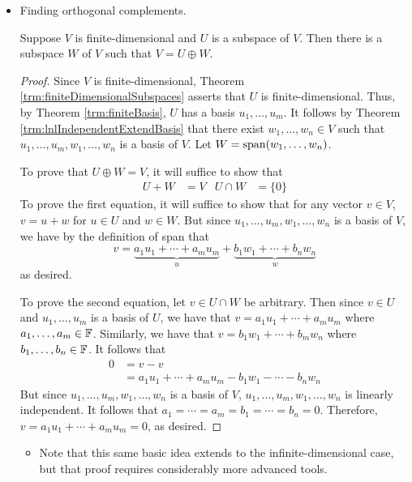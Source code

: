 \documentclass[../main.tex]{subfiles}
\begin{document}
\begin{itemize}
\begin{theorem}
\begin{proof}
        \end{proof}
    \end{theorem}
    \item Finding orthogonal complements.
    \begin{theorem}\label{trm:orthogonalComplement}
        Suppose $V$ is finite-dimensional and $U$ is a subspace of $V$. Then there is a subspace $W$ of $V$ such that $V=U\oplus W$.
        \begin{proof}
            Since $V$ is finite-dimensional, Theorem \ref{trm:finiteDimensionalSubspaces} asserts that $U$ is finite-dimensional. Thus, by Theorem \ref{trm:finiteBasis}, $U$ has a basis $u_1,\dots,u_m$. It follows by Theorem \ref{trm:lnlIndependentExtendBasis} that there exist $w_1,\dots,w_n\in V$ such that $u_1,\dots,u_m,w_1,\dots,w_n$ is a basis of $V$. Let $W=\operatorname{span}(w_1,\dots,w_n)$.\par
            To prove that $U\oplus W=V$, it will suffice to show that
            \begin{align*}
                U+W &= V&
                U\cap W &= \{0\}
            \end{align*}
            To prove the first equation, it will suffice to show that for any vector $v\in V$, $v=u+w$ for $u\in U$ and $w\in W$. But since $u_1,\dots,u_m,w_1,\dots,w_n$ is a basis of $V$, we have by the definition of span that
            \begin{equation*}
                v = \underbrace{a_1u_1+\cdots+a_mu_m}_u+\underbrace{b_1w_1+\cdots+b_nw_n}_w
            \end{equation*}
            as desired.\par
            To prove the second equation, let $v\in U\cap W$ be arbitrary. Then since $v\in U$ and $u_1,\dots,u_m$ is a basis of $U$, we have that $v=a_1u_1+\cdots+a_mu_m$ where $a_1,\dots,a_m\in\mathbb{F}$. Similarly, we have that $v=b_1w_1+\cdots+b_mw_n$ where $b_1,\dots,b_n\in\mathbb{F}$. It follows that
            \begin{align*}
                0 &= v-v\\
                &= a_1u_1+\cdots+a_mu_m-b_1w_1-\cdots-b_nw_n
            \end{align*}
            But since $u_1,\dots,u_m,w_1,\dots,w_n$ is a basis of $V$, $u_1,\dots,u_m,w_1,\dots,w_n$ is linearly independent. It follows that $a_1=\cdots=a_m=b_1=\cdots=b_n=0$. Therefore, $v=a_1u_1+\cdots+a_mu_m=0$, as desired.
        \end{proof}
    \end{theorem}
    \begin{itemize}
        \item Note that this same basic idea extends to the infinite-dimensional case, but that proof requires considerably more advanced tools.
    \end{itemize}
\end{itemize}
\end{document}
